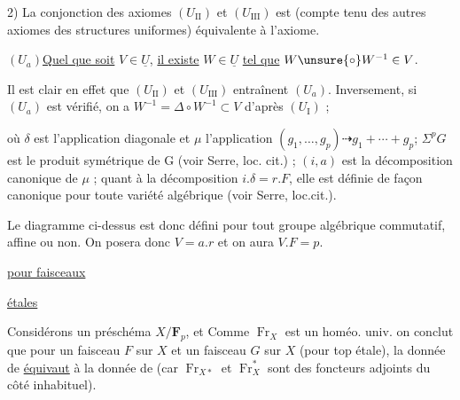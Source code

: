 2) La conjonction des axiomes $(U_{\mathrm{II}})$ et $(U_{\mathrm{III}})$ est (compte tenu des autres axiomes des structures uniformes) équivalente à l'axiome.

$(U_a)$\quad \uline{Quel que soit} $V\in\underline U$, \uline{il existe} $W\in\underline U$ \uline{tel que} $W\unsure{\circ}W^{-1}\in V$.

Il est clair en effet que $(U_{\mathrm{II}})$ et $(U_{\mathrm{III}})$ entraînent $(U_a)$. Inversement, si $(U_a)$ est vérifié, on a $W^{-1}=\Delta\circ W^{-1}\subset V$ d'après $(U_{\mathrm I})$ ;


où $\delta$ est l'application diagonale et $\mu$ l'application $(g_1,\ldots,g_p)\dashrightarrow g_1+\cdots+g_p$; $\Sigma^pG$ est le produit symétrique de G (voir Serre, loc. cit.) ; $(i,a)$ est la décomposition canonique de $\mu$ ; quant à la décomposition $i.\delta=r.F$, elle est définie de façon canonique pour toute variété algébrique (voir Serre, loc.cit.).

Le diagramme ci-dessus est donc défini pour tout groupe algébrique commutatif, affine ou non. On posera donc $V=a.r$ et on aura $V.F=p$.

\uline{}

\uline{pour faisceaux}

\uline{étales}


\uline{}

Considérons un préschéma $X/\mathbf F_p$, et
Comme $\operatorname{Fr}_X$ est un homéo. univ. on conclut que pour un faisceau $F$ sur $X$ et un faisceau $G$ sur $X$ (pour top étale), la donnée de
\uline{équivaut} à la donnée de
(car $\operatorname{Fr}_{X*}$ et $\operatorname{Fr}_X^*$ sont  des foncteurs adjoints du côté inhabituel).

